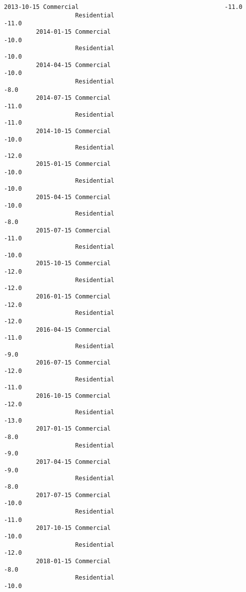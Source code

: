 \documentclass[11pt]{article}
\begin{document}
\begin{Verbatim}[commandchars=\\\{\}]
         2013-10-15 Commercial                                         -11.0   
                    Residential                                        -11.0   
         2014-01-15 Commercial                                         -10.0   
                    Residential                                        -10.0   
         2014-04-15 Commercial                                         -10.0   
                    Residential                                         -8.0   
         2014-07-15 Commercial                                         -11.0   
                    Residential                                        -11.0   
         2014-10-15 Commercial                                         -10.0   
                    Residential                                        -12.0   
         2015-01-15 Commercial                                         -10.0   
                    Residential                                        -10.0   
         2015-04-15 Commercial                                         -10.0   
                    Residential                                         -8.0   
         2015-07-15 Commercial                                         -11.0   
                    Residential                                        -10.0   
         2015-10-15 Commercial                                         -12.0   
                    Residential                                        -12.0   
         2016-01-15 Commercial                                         -12.0   
                    Residential                                        -12.0   
         2016-04-15 Commercial                                         -11.0   
                    Residential                                         -9.0   
         2016-07-15 Commercial                                         -12.0   
                    Residential                                        -11.0   
         2016-10-15 Commercial                                         -12.0   
                    Residential                                        -13.0   
         2017-01-15 Commercial                                          -8.0   
                    Residential                                         -9.0   
         2017-04-15 Commercial                                          -9.0   
                    Residential                                         -8.0   
         2017-07-15 Commercial                                         -10.0   
                    Residential                                        -11.0   
         2017-10-15 Commercial                                         -10.0   
                    Residential                                        -12.0   
         2018-01-15 Commercial                                          -8.0   
                    Residential                                        -10.0   
         

\end{Verbatim}
\end{document}
